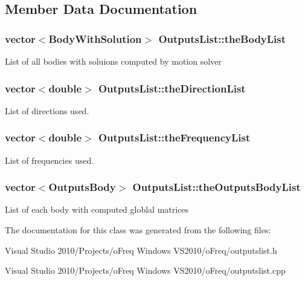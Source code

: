 \subsection{Member Data Documentation}
\hypertarget{class_outputs_list_a641a2087534a39ba07e5dcc373c3e993}{
\subsubsection[{the\-Body\-List}]{\setlength{\rightskip}{0pt plus 5cm}vector$<${\bf Body\-With\-Solution}$>$ Outputs\-List\-::the\-Body\-List}}\label{class_outputs_list_a641a2087534a39ba07e5dcc373c3e993}
List of all bodies with soluions computed by motion solver \hypertarget{class_outputs_list_a2378aea897a70d83842b4aabe3d3c3c2}{
\subsubsection[{the\-Direction\-List}]{\setlength{\rightskip}{0pt plus 5cm}vector$<$double$>$ Outputs\-List\-::the\-Direction\-List}}\label{class_outputs_list_a2378aea897a70d83842b4aabe3d3c3c2}
List of directions used. \hypertarget{class_outputs_list_afb577c627b76bd4734a450af611313e7}{
\subsubsection[{the\-Frequency\-List}]{\setlength{\rightskip}{0pt plus 5cm}vector$<$double$>$ Outputs\-List\-::the\-Frequency\-List}}\label{class_outputs_list_afb577c627b76bd4734a450af611313e7}
List of frequencies used. \hypertarget{class_outputs_list_a060736f6168b7a7ff22480c59ab1cae1}{
\subsubsection[{the\-Outputs\-Body\-List}]{\setlength{\rightskip}{0pt plus 5cm}vector$<${\bf Outputs\-Body}$>$ Outputs\-List\-::the\-Outputs\-Body\-List}}\label{class_outputs_list_a060736f6168b7a7ff22480c59ab1cae1}
List of each body with computed globlal matrices 

The documentation for this class was generated from the following files\-:\begin{DoxyCompactItemize}
\item 
Visual Studio 2010/\-Projects/o\-Freq Windows V\-S2010/o\-Freq/outputslist.\-h\item 
Visual Studio 2010/\-Projects/o\-Freq Windows V\-S2010/o\-Freq/outputslist.\-cpp\end{DoxyCompactItemize}
